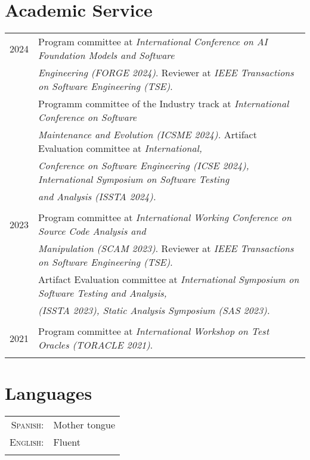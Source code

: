 \documentclass[a4paper,10pt]{article} %
\begin{document}
\section{Academic Service}
\begin{longtable}{rl}

\textsc{2024} & Program committee at \textit{International Conference on AI Foundation Models and Software} \\ 
& \textit{Engineering (FORGE 2024)}. Reviewer at \textit{IEEE Transactions on Software Engineering (TSE)}. \\
& Programm committee of the Industry track at \textit{International Conference on Software} \\
& \textit{Maintenance and Evolution (ICSME 2024).} Artifact Evaluation committee at \textit{International,} \\
& \textit{Conference on Software Engineering (ICSE 2024), International Symposium on Software Testing} \\ 
& \textit{and Analysis (ISSTA 2024).} \\ & \\

\textsc{2023} & Program committee at \textit{International Working Conference on Source Code Analysis and} \\ 
& \textit{Manipulation (SCAM 2023)}. Reviewer at \textit{IEEE Transactions on Software Engineering (TSE)}. \\
& Artifact Evaluation committee at \textit{International Symposium on Software Testing and Analysis,} \\ 
& \textit{(ISSTA 2023), Static Analysis Symposium (SAS 2023).} \\ & \\

\textsc{2021} & Program committee at \textit{International Workshop on Test Oracles (TORACLE 2021)}. \\ & \\


\end{longtable}

\section{Languages}
\begin{tabular}{rl}
\\
\textsc{Spanish:} & Mother tongue\\
\textsc{English:} & Fluent \\ & \\
\end{tabular}
\end{document}

